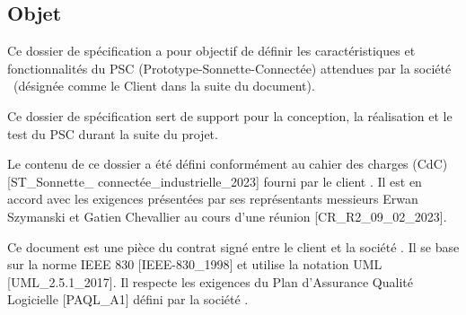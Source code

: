 \subsection{Objet}

Ce dossier de spécification a pour objectif de définir les caractéristiques et fonctionnalités du PSC (Prototype-Sonnette-Connectée) attendues par la société \client\ (désignée comme le Client dans la suite du document).

Ce dossier de spécification sert de support pour la conception, la réalisation et le test du PSC durant la suite du projet.

Le contenu de ce dossier a été défini conformément au cahier des charges (CdC) [ST\_Sonnette\_
connectée\_industrielle\_2023] fourni par le client \client.
Il est en accord avec les exigences présentées par ses représentants messieurs Erwan Szymanski et Gatien Chevallier au cours d’une réunion [CR\_R2\_09\_02\_2023].

Ce document est une pièce du contrat signé entre le client et la société \groupe.
Il se base sur la norme IEEE 830 [IEEE-830\_1998] et utilise la notation UML [UML\_2.5.1\_2017].
Il respecte les exigences du Plan d’Assurance Qualité Logicielle [PAQL\_A1]  défini par la société \groupe.